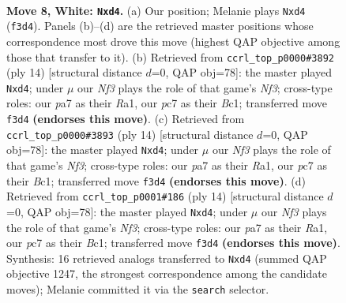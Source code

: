 \documentclass[11pt]{article}
\begin{document}
\begin{figure}[p]\centering
\begin{subfigure}{0.46\textwidth}\centering
\resizebox{\linewidth}{!}{%
\newchessgame
\chessboard[
  setfen={rnbq1rk1/ppp2pbp/3p1np1/8/2PpP3/2N2N2/PP2BPPP/R1BQ1RK1 w - - 0 8},
  showmover=false,
  pgfstyle=straightmove, color=movearrow, markmove={f3-d4}
]}
\caption{}
\end{subfigure}\hfill
\begin{subfigure}{0.46\textwidth}\centering
\resizebox{\linewidth}{!}{%
\newchessgame
\chessboard[
  setfen={rnbq1rk1/ppp2pbp/3p1np1/8/2PpP3/2N2N2/PP2BPPP/R1BQ1RK1 w - - 0 8},
  showmover=false,
  pgfstyle=straightmove, color=movearrow, markmove={f3-d4}
]}
\caption{}
\end{subfigure}
\\[4pt]
\begin{subfigure}{0.46\textwidth}\centering
\resizebox{\linewidth}{!}{%
\newchessgame
\chessboard[
  setfen={rnbq1rk1/ppp2pbp/3p1np1/8/2PpP3/2N2N2/PP2BPPP/R1BQ1RK1 w - - 0 8},
  showmover=false,
  pgfstyle=straightmove, color=movearrow, markmove={f3-d4}
]}
\caption{}
\end{subfigure}\hfill
\begin{subfigure}{0.46\textwidth}\centering
\resizebox{\linewidth}{!}{%
\newchessgame
\chessboard[
  setfen={rnbq1rk1/ppp2pbp/3p1np1/8/2PpP3/2N2N2/PP2BPPP/R1BQ1RK1 w - - 0 8},
  showmover=false,
  pgfstyle=straightmove, color=movearrow, markmove={f3-d4}
]}
\caption{}
\end{subfigure}
\caption{\textbf{Move 8, White: \texttt{Nxd4}.} (a) Our position; Melanie plays \texttt{Nxd4} (\texttt{f3d4}). Panels (b)--(d) are the retrieved master positions whose correspondence most drove this move (highest QAP objective among those that transfer to it). (b) Retrieved from \texttt{ccrl\_top\_p0000\#3892} (ply 14) [structural distance $d$=0, QAP obj=78]: the master played \texttt{Nxd4}; under $\mu$ our \emph{Nf3} plays the role of that game's \emph{Nf3}; cross-type roles: our \emph{p}a7 as their \emph{R}a1, our \emph{p}c7 as their \emph{B}c1; transferred move \texttt{f3d4} \textbf{(endorses this move)}. (c) Retrieved from \texttt{ccrl\_top\_p0000\#3893} (ply 14) [structural distance $d$=0, QAP obj=78]: the master played \texttt{Nxd4}; under $\mu$ our \emph{Nf3} plays the role of that game's \emph{Nf3}; cross-type roles: our \emph{p}a7 as their \emph{R}a1, our \emph{p}c7 as their \emph{B}c1; transferred move \texttt{f3d4} \textbf{(endorses this move)}. (d) Retrieved from \texttt{ccrl\_top\_p0001\#186} (ply 14) [structural distance $d$=0, QAP obj=78]: the master played \texttt{Nxd4}; under $\mu$ our \emph{Nf3} plays the role of that game's \emph{Nf3}; cross-type roles: our \emph{p}a7 as their \emph{R}a1, our \emph{p}c7 as their \emph{B}c1; transferred move \texttt{f3d4} \textbf{(endorses this move)}. Synthesis: 16 retrieved analogs transferred to \texttt{Nxd4} (summed QAP objective 1247, the strongest correspondence among the candidate moves); Melanie committed it via the \texttt{search} selector.}
\label{fig:thought-m14}
\end{figure}
\end{document}
